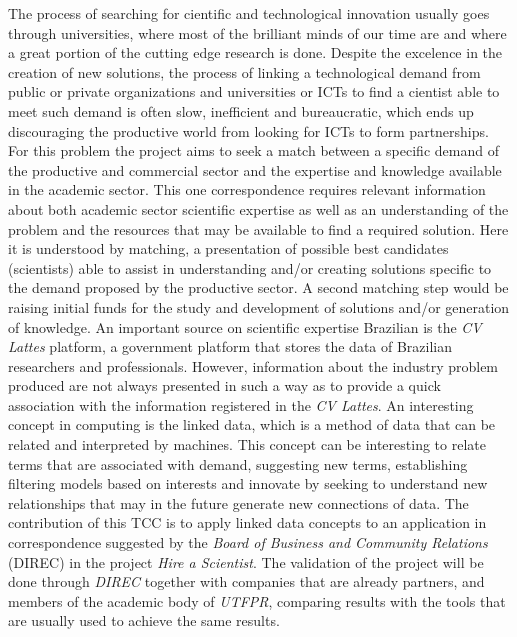 \begin{abstractutfpr}
    The process of searching for cientific and technological innovation usually goes through universities, where most of the brilliant minds of our time are and where a great portion of the cutting edge research is done. Despite the excelence in the creation of new solutions, the process of linking a technological demand from public or private organizations and universities or ICTs to find a cientist able to meet such demand is often slow, inefficient and bureaucratic, which ends up discouraging the productive world from looking for ICTs to form partnerships. For this problem the project aims to seek a match between a specific demand of the productive and commercial sector and the expertise and knowledge available in the academic sector. This one correspondence requires relevant information about both academic sector scientific expertise as well as an understanding of the problem and the resources that may be available to find a required solution. Here it is understood by matching, a presentation of possible best candidates (scientists) able to assist in understanding and/or creating solutions specific to the demand proposed by the productive sector. A second matching step would be raising initial funds for the study and development of solutions and/or generation of knowledge. An important source on scientific expertise Brazilian is the \emph{CV Lattes} platform, a government platform that stores the data of Brazilian researchers and professionals. However, information about the industry problem produced are not always presented in such a way as to provide a quick association with the information registered in the \emph{CV Lattes}.
    An interesting concept in computing is the linked data, which is a method of data that can be related and interpreted by machines. This concept can be interesting to relate terms that are associated with demand, suggesting new terms, establishing filtering models based on interests and innovate by seeking to understand new relationships that may in the future generate new connections of data. The contribution of this TCC is to apply linked data concepts to an application in correspondence suggested by the \emph{Board of Business and Community Relations} (DIREC) in the project \emph{Hire a Scientist}. The validation of the project will be done through \emph{DIREC} together with companies that are already partners, and members of the academic body of \emph{UTFPR}, comparing results with the tools that are usually used to achieve the same results.
\end{abstractutfpr}
